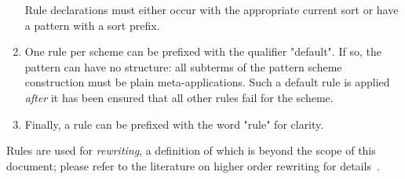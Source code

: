 \documentclass[12pt]{article} %
\begin{document}
\begin{manual}
\begin{enumerate}
    Rule declarations must either occur with the appropriate current sort or have a pattern with a
    sort prefix.

  \item One rule per scheme can be prefixed with the qualifier "default". If so, the pattern can
    have no structure: all subterms of the pattern scheme construction must be plain
    meta-applications. Such a default rule is applied \emph{after} it has been ensured that all
    other rules fail for the scheme.

  \item Finally, a rule can be prefixed with the word "rule" for clarity.

  \end{enumerate}
  Rules are used for \emph{rewriting}, a definition of which is beyond the scope of this document;
  please refer to the literature on higher order rewriting for details~\cite{Jouannaud:klop2005,Klop+:tcs1993}.
\end{manual}
\end{document}
